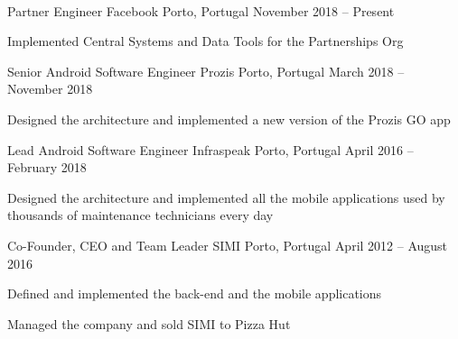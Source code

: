 \documentclass[]{awesome-cv}
\begin{document}
\begin{center}
	  \\
	
\end{center}
\vspace{-3mm}
\begin{cventries}

\vspace{-2mm}
	\cventry
	{Partner Engineer}
	{Facebook}
	{Porto, Portugal}
	{November 2018 – Present}
	{\begin{cvitems}
		\item {Implemented Central Systems and Data Tools for the Partnerships Org}
	\end{cvitems}}
	
	\vspace{-4mm}
	\cventry
	{Senior Android Software Engineer}
	{Prozis}
	{Porto, Portugal}
	{March 2018 – November 2018}
	{\begin{cvitems}
		\item {Designed the architecture and implemented a new version of the Prozis GO app}
	\end{cvitems}}
	

	
	\vspace{-4mm}
	\cventry
	{Lead Android Software Engineer}
	{Infraspeak}
	{Porto, Portugal}
	{April 2016 – February 2018}
	{\begin{cvitems}
		\item {Designed the architecture and implemented all the mobile applications used by thousands of maintenance technicians every day}
		\end{cvitems}}
		
	\vspace{-4mm}
	\cventry
	{Co-Founder, CEO and Team Leader}
	{SIMI}
	{Porto, Portugal}
	{April 2012 – August 2016}
	{\begin{cvitems}
		\item {Defined and implemented the back-end and the mobile applications}
		\item {Managed the company and sold SIMI to Pizza Hut}
		\end{cvitems}}
	

\end{cventries}
\end{document}
